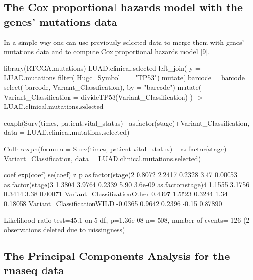 \newpage

\subsection{The Cox proportional hazards model with the genes' mutations
data}\label{the-cox-proportional-hazards-model-with-the-genes-mutations-data}

In a simple way one can use previously selected data to merge them with
genes' mutations data and to compute Cox proportional hazards model
{[}9{]}.

\begin{Schunk}
\begin{Sinput}
library(RTCGA.mutations)
LUAD.clinical.selected %
      left_join( y = LUAD.mutations %
                    filter( Hugo_Symbol == "TP53") %
                    mutate( barcode = barcode %
                    select( barcode, Variant_Classification),
                 by = "barcode") %
                    mutate( Variant_Classification = divideTP53(Variant_Classification) ) ->
   LUAD.clinical.mutations.selected

coxph(Surv(times, patient.vital_status)~ as.factor(stage)+Variant_Classification,
      data = LUAD.clinical.mutations.selected)
\end{Sinput}
\begin{Soutput}
Call:
coxph(formula = Surv(times, patient.vital_status) ~ as.factor(stage) + 
    Variant_Classification, data = LUAD.clinical.mutations.selected)


                               coef exp(coef) se(coef)     z       p
as.factor(stage)2            0.8072    2.2417   0.2328  3.47 0.00053
as.factor(stage)3            1.3804    3.9764   0.2339  5.90 3.6e-09
as.factor(stage)4            1.1555    3.1756   0.3414  3.38 0.00071
Variant_ClassificationOther  0.4397    1.5523   0.3284  1.34 0.18058
Variant_ClassificationWILD  -0.0365    0.9642   0.2396 -0.15 0.87890

Likelihood ratio test=45.1  on 5 df, p=1.36e-08
n= 508, number of events= 126 
   (2 observations deleted due to missingness)
\end{Soutput}
\end{Schunk}

\newpage

\subsection{The Principal Components Analysis for the rnaseq
data}\label{the-principal-components-analysis-for-the-rnaseq-data}


